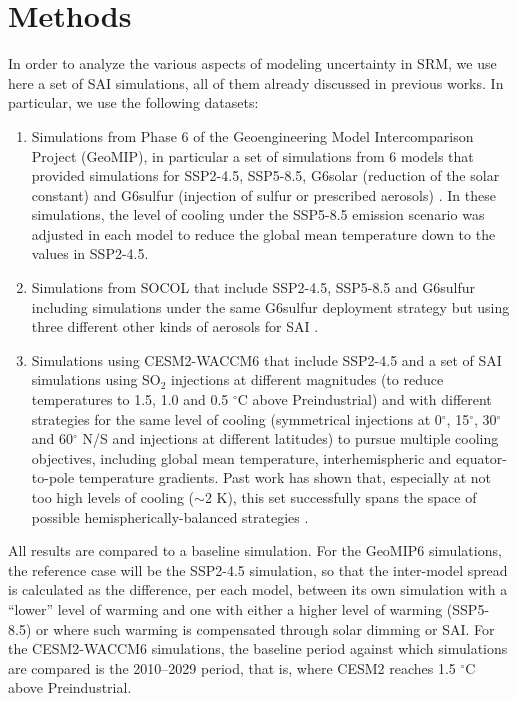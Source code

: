 \documentclass[draft]{agujournal2019}
\begin{document}
\section{Methods}

In order to analyze the various aspects of modeling uncertainty in SRM, we use here a set of SAI simulations, all of them already discussed in previous works. In particular, we use the following datasets:

\begin{enumerate}
    \item Simulations from Phase 6 of the Geoengineering Model Intercomparison Project (GeoMIP), in particular a set of simulations from 6 models that provided simulations for SSP2-4.5, SSP5-8.5, G6solar (reduction of the solar constant) and G6sulfur (injection of sulfur or prescribed aerosols) \cite{Visioni2021}. In these simulations, the level of cooling under the SSP5-8.5 emission scenario was adjusted in each model to reduce the global mean temperature down to the values in SSP2-4.5.
    \item Simulations from SOCOL that include SSP2-4.5, SSP5-8.5 and G6sulfur including simulations under the same G6sulfur deployment strategy but using three different other kinds of aerosols for SAI \cite{Geurts2026}.
    \item Simulations using CESM2-WACCM6 that include SSP2-4.5 and a set of SAI simulations using SO$_2$ injections at different magnitudes (to reduce temperatures to 1.5, 1.0 and 0.5 $^{\circ}$C above Preindustrial) and with different strategies for the same level of cooling (symmetrical injections at 0$^{\circ}$, 15$^{\circ}$, 30$^{\circ}$ and 60$^{\circ}$ N/S and injections at different latitudes) to pursue multiple cooling objectives, including global mean temperature, interhemispheric and equator-to-pole temperature gradients. Past work has shown that, especially at not too high levels of cooling ($\sim$2 K), this set successfully spans the space of possible hemispherically-balanced strategies \cite{zhang_how_2022}.
\end{enumerate}

All results are compared to a baseline simulation. For the GeoMIP6 simulations, the reference case will be the SSP2-4.5 simulation, so that the inter-model spread is calculated as the difference, per each model, between its own simulation with a ``lower'' level of warming and one with either a higher level of warming (SSP5-8.5) or where such warming is compensated through solar dimming or SAI. For the CESM2-WACCM6 simulations, the baseline period against which simulations are compared is the 2010--2029 period, that is, where CESM2 reaches 1.5 $^{\circ}$C above Preindustrial.
\end{document}
